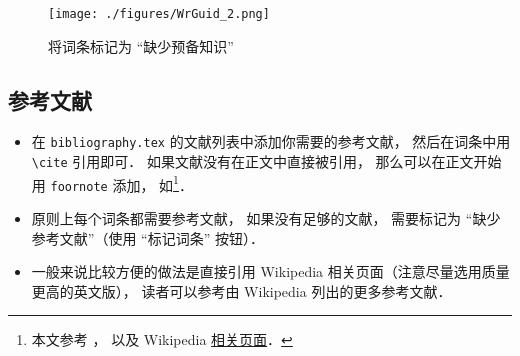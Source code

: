 \begin{figure}[ht]
\centering
\texttt{[image: ./figures/WrGuid\_2.png]}
\caption{将词条标记为 “缺少预备知识”} \label{WrGuid_fig2}
\end{figure}

\subsection{参考文献}
\begin{itemize}
\item 在 \verb|bibliography.tex| 的文献列表中添加你需要的参考文献， 然后在词条中用 \verb|\cite| 引用即可． 如果文献没有在正文中直接被引用， 那么可以在正文开始用 \verb|foornote| 添加， 如\footnote{本文参考 \cite{GriffE}， \cite{GriffQ} 以及 Wikipedia \href{https://www.wikipedia.org/}{相关页面}．}．
\item 原则上每个词条都需要参考文献， 如果没有足够的文献， 需要标记为 “缺少参考文献”（使用 “标记词条” 按钮）．
\item 一般来说比较方便的做法是直接引用 Wikipedia 相关页面（注意尽量选用质量更高的英文版）， 读者可以参考由 Wikipedia 列出的更多参考文献．
\end{itemize}
